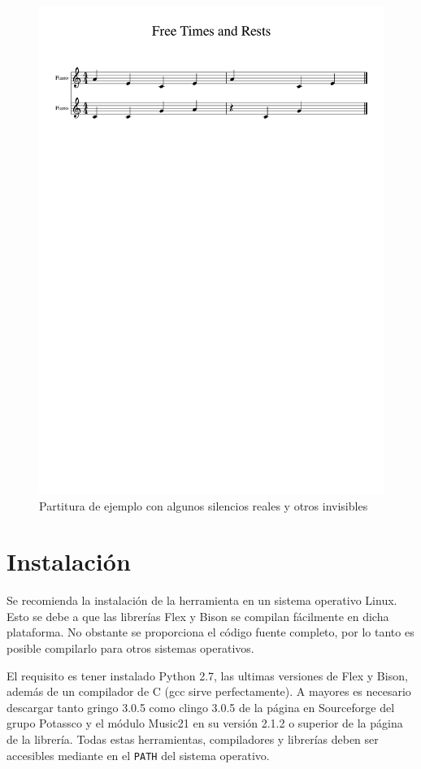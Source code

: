  \begin{figure}
 	\centering
 	\includegraphics[width=0.8\linewidth]{imagenes/scores/freetimerests.pdf}
 	\caption{Partitura de ejemplo con algunos silencios reales y otros invisibles}
 	\label{fig:rests_score}
 \end{figure}
 
\chapter{Instalación}
Se recomienda la instalación de la herramienta en un sistema operativo Linux. Esto se debe a que las librerías Flex y Bison se  compilan fácilmente en dicha plataforma. No obstante se proporciona el código fuente completo, por lo tanto es posible compilarlo para otros sistemas operativos.

El requisito es tener instalado Python 2.7, las ultimas versiones de Flex y Bison, además de un compilador de C (gcc sirve perfectamente). A mayores es necesario descargar tanto gringo 3.0.5 como clingo 3.0.5 de la página en Sourceforge del grupo Potassco y el módulo Music21 en su versión 2.1.2 o superior de la página de la librería. Todas estas herramientas, compiladores y librerías deben ser accesibles mediante en el \texttt{PATH} del sistema operativo.

